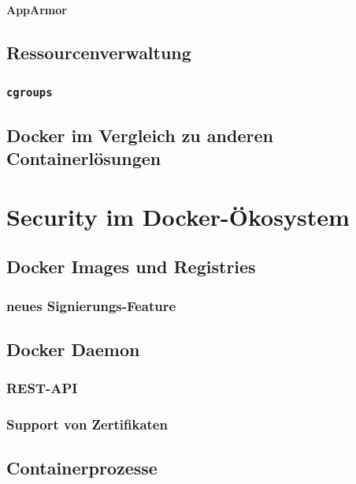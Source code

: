\documentclass[11pt,a4paper,oneside]{report}
\begin{document}
      \subsubsection{AppArmor}
	\section{Ressourcenverwaltung}
		\subsection{\texttt{cgroups}}
	\section{Docker im Vergleich zu anderen Containerlösungen}
\chapter{Security im Docker-Ökosystem}
  \section{Docker Images und Registries}
		\subsection{neues Signierungs-Feature}
	\section{Docker Daemon}
		\subsection{REST-API}
		\subsection{Support von Zertifikaten}
  \section{Containerprozesse}
\end{document}
